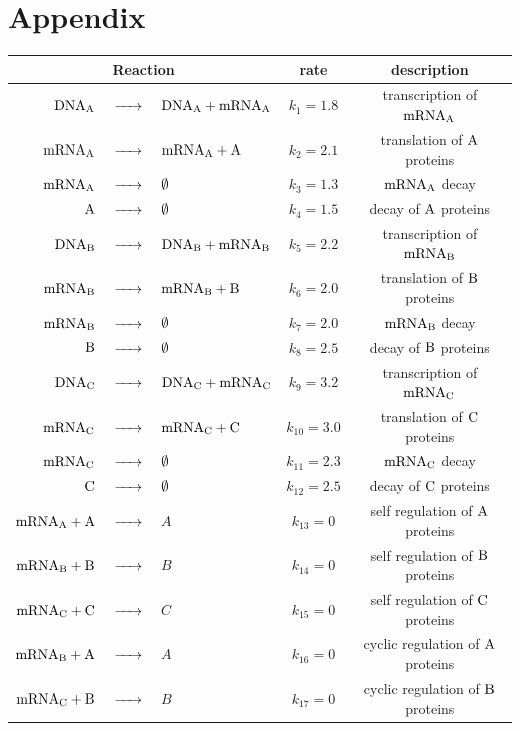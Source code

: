\documentclass[oneside, abstracton, titlepage]{scrartcl}
\begin{document}
	\section{Appendix}
	\begin{table}
		\centering
		\begin{tabular}{rclcc}
			\multicolumn{3}{c}{Reaction} & rate & description \\ \hline\noalign{\vskip .1cm}
			$\ce{DNA_A}$ &$\ce{->}$& $\ce{DNA_A + mRNA_A }$ & $k_1 = 1.8$ & transcription of $\ce{mRNA_A}$\\
			$\ce{mRNA_A}$ &$\ce{->}$& $\ce{mRNA_A + A}$ & $k_2 = 2.1$ & translation of $\ce{A}$ proteins\\
			$\ce{mRNA_A}$ &$\ce{->}$& $\ce{\emptyset}$ & $k_3 = 1.3$ & $\ce{mRNA_A}$ decay\\
			$\ce{A}$ &$\ce{->}$& $\ce{\emptyset }$ & $k_4 = 1.5$ & decay of $\ce{A}$ proteins\\
			$\ce{DNA_B}$ &$\ce{->}$& $\ce{DNA_B + mRNA_B }$ & $k_5 = 2.2$ & transcription of $\ce{mRNA_B}$\\
			$\ce{mRNA_B}$ &$\ce{->}$& $\ce{mRNA_B + B}$ & $k_6 = 2.0$ & translation of $\ce{B}$ proteins\\
			$\ce{mRNA_B}$ &$\ce{->}$& $\ce{\emptyset }$ & $k_7 = 2.0$ & $\ce{mRNA_B}$ decay\\
			$\ce{B}$ &$\ce{->}$& $\ce{\emptyset }$ & $k_8 = 2.5$ & decay of $\ce{B}$ proteins\\
			$\ce{DNA_C}$ &$\ce{->}$& $\ce{DNA_C + mRNA_C }$ & $k_9 = 3.2$ & transcription of $\ce{mRNA_C}$\\
			$\ce{mRNA_C}$ &$\ce{->}$& $\ce{mRNA_C + C}$ & $k_{10} = 3.0$ & translation of $\ce{C}$ proteins\\
			$\ce{mRNA_C}$ &$\ce{->}$& $\ce{\emptyset }$ & $k_{11} = 2.3$ & $\ce{mRNA_C}$ decay\\
			$\ce{C}$ &$\ce{->}$& $\ce{\emptyset }$ & $k_{12} = 2.5$ & decay of $\ce{C}$ proteins\\
			$\ce{mRNA_A + A}$ &$\ce{->}$& $A$ & $k_{13} = 0$ & self regulation of $\ce{A}$ proteins\\
			$\ce{mRNA_B + B}$ &$\ce{->}$& $B$ & $k_{14} = 0$ & self regulation of $\ce{B}$ proteins\\
			$\ce{mRNA_C + C}$ &$\ce{->}$& $C$ & $k_{15} = 0$ & self regulation of $\ce{C}$ proteins\\
			$\ce{mRNA_B + A}$ &$\ce{->}$& $A$ & $k_{16} = 0$ & cyclic regulation of $\ce{A}$ proteins\\
			$\ce{mRNA_C + B}$ &$\ce{->}$& $B$ & $k_{17} = 0$ & cyclic regulation of $\ce{B}$ proteins\\

\end{tabular}
\end{table}
\end{document}
